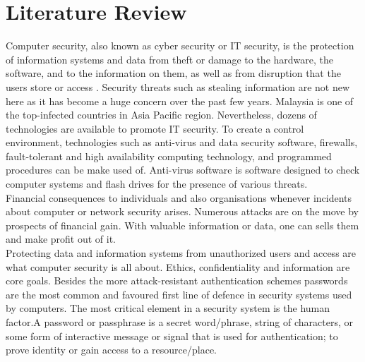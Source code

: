 \documentclass[a4paper,12pt]{article}
\begin{document}
\section{Literature Review}
Computer security, also known as cyber security or IT security, is the protection of information systems and data from theft or damage to the hardware, the software, and to the information on them, as well as from disruption that the users store or access . Security threats such as stealing information are not new here as it has become a huge concern over the past few years. Malaysia is one of the top-infected countries in Asia Pacific region. Nevertheless, dozens of technologies are available to promote IT security. To create a control environment, technologies such as anti-virus and data security software, firewalls, fault-tolerant and high availability computing technology, and programmed procedures can be make used of. Anti-virus software is software designed to check computer systems and flash drives for the presence of various threats.
\\
Financial consequences to individuals and also organisations whenever incidents about computer or network security arises. Numerous attacks are on the move by prospects of financial gain. With valuable 
information or data, one can sells them and make profit out of it.
\\
Protecting data and information systems from unauthorized users and access are what computer security is all about. Ethics, confidentiality and information are core goals. Besides the more attack-resistant authentication schemes passwords are the most common and favoured first line of defence in security systems used by computers. The  most critical element in a security system is the human factor.A password or passphrase is a secret word/phrase, string of characters, or some form of interactive message or signal that is used for authentication; to prove identity or gain access to a resource/place. 


\end{document}
